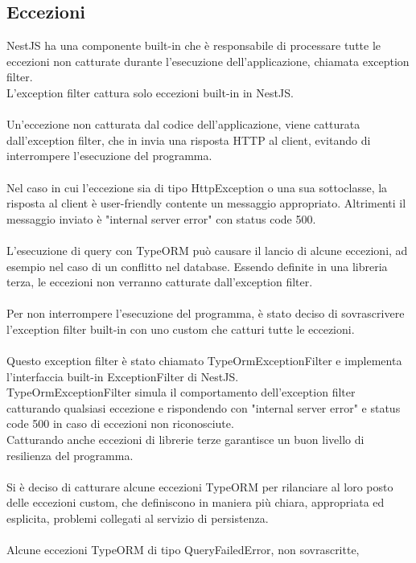 \subsection{Eccezioni}
NestJS ha una componente built-in che è responsabile di processare tutte le eccezioni non catturate durante 
l'esecuzione dell'applicazione, chiamata exception filter.
\\
L'exception filter cattura solo eccezioni built-in in NestJS.
\\\\
Un'eccezione non catturata dal codice dell'applicazione, viene catturata dall'exception filter, che
 in invia una risposta \gls{HTTP} al client, evitando di interrompere
l'esecuzione del programma.
\\\\
Nel caso in cui l'eccezione sia di tipo HttpException o una sua sottoclasse, la risposta al client è
user-friendly contente un messaggio appropriato.
Altrimenti il messaggio inviato è "internal server error" con status code 500.
\\\\
L'esecuzione di query con TypeORM può causare il lancio di alcune eccezioni, ad esempio nel caso di un conflitto nel database. 
Essendo definite in una libreria terza, le eccezioni non verranno catturate dall'exception filter.
\\\\
Per non interrompere l'esecuzione del programma,
è stato deciso di 
sovrascrivere l'exception filter built-in con uno custom che catturi tutte le eccezioni. 
\\\\
Questo exception filter è stato chiamato TypeOrmExceptionFilter e implementa l'interfaccia built-in ExceptionFilter 
di NestJS. 
\\
TypeOrmExceptionFilter simula il comportamento dell'exception filter catturando qualsiasi
eccezione e rispondendo con "internal server error" e status code 500 in caso di eccezioni non riconosciute.
\\
Catturando anche eccezioni di librerie terze garantisce un buon livello di resilienza
del programma. 
\\\\
Si è deciso di catturare alcune eccezioni TypeORM per rilanciare al loro posto delle eccezioni custom, che
definiscono in maniera più chiara, appropriata
ed esplicita, problemi collegati al servizio di persistenza.
\\\\
Alcune eccezioni TypeORM di tipo QueryFailedError, non sovrascritte, 
